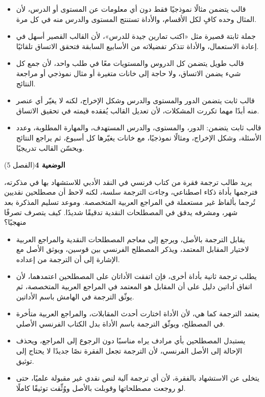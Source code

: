 \documentclass[11pt,a4paper]{article}
\begin{document}
\begin{itemize}[leftmargin=1.0cm, labelsep=6pt, itemsep=3pt, topsep=4pt, parsep=0pt]
  \item[\textbf{أ)}] قالب يتضمن مثالًا نموذجيًا فقط دون أي معلومات عن المستوى أو الدرس، لأن المثال وحده كافٍ لكل الأقسام، والأداة تستنتج المستوى والدرس منه في كل مرة.
  \item[\textbf{ب)}] جملة ثابتة قصيرة مثل «اكتب تمارين جيدة للدرس»، لأن القالب القصير أسهل في إعادة الاستعمال، والأداة تتذكر تفضيلاته من الأسابيع السابقة فتحقق الاتساق تلقائيًا.
  \item[\textbf{ج)}] قالب طويل يتضمن كل الدروس والمستويات معًا في طلب واحد، لأن جمع كل شيء يضمن الاتساق، ولا حاجة إلى خانات متغيرة أو مثال نموذجي أو مراجعة النتائج.
  \item[\textbf{د)}] قالب ثابت يتضمن الدور والمستوى والدرس وشكل الإخراج، لكنه لا يغيّر أي عنصر منه أبدًا مهما تكررت المشكلات، لأن تعديل القالب يُفقده قيمته في تحقيق الاتساق.
  \item[\textbf{هـ)}] قالب ثابت يتضمن: الدور، والمستوى، والدرس المستهدف، والمهارة المطلوبة، وعدد الأسئلة، وشكل الإخراج، ومثالًا نموذجيًا، مع خانات يغيّرها كل أسبوع، ثم يراجع النتائج ويحسّن القالب تدريجيًا.
\end{itemize}
\par\vspace{6pt}
\noindent
{\large\khatt\textbf{الوضعية 4}}\hfill{\small(الفصل 5)}\par\nopagebreak\vspace{3pt}
\setlength{\fboxsep}{7pt}\colorbox{gray!10}{\parbox{\dimexpr\linewidth-14pt}{يريد طالب ترجمة فقرة من كتاب فرنسي في النقد الأدبي للاستشهاد بها في مذكرته، فترجمها بأداة ذكاء اصطناعي، وجاءت الترجمة سلسة، لكنه لاحظ أن مصطلحين نقديين تُرجما بألفاظ غير مستعملة في المراجع العربية المتخصصة. وموعد تسليم المذكرة بعد شهر، ومشرفه يدقق في المصطلحات النقدية تدقيقًا شديدًا. كيف يتصرف تصرفًا منهجيًا؟}}\par\nopagebreak
\begin{itemize}[leftmargin=1.0cm, labelsep=6pt, itemsep=3pt, topsep=4pt, parsep=0pt]
  \item[\textbf{أ)}] يقابل الترجمة بالأصل، ويرجع إلى معاجم المصطلحات النقدية والمراجع العربية لاختيار المقابل المعتمد، ويذكر المصطلح الفرنسي بين قوسين، ويوثق الأصل مع الإشارة إلى أن الترجمة من إعداده.
  \item[\textbf{ب)}] يطلب ترجمة ثانية بأداة أخرى، فإن اتفقت الأداتان على المصطلحين اعتمدهما، لأن اتفاق أداتين دليل على أن المقابل هو المعتمد في المراجع العربية المتخصصة، ثم يوثّق الترجمة في الهامش باسم الأداتين.
  \item[\textbf{ج)}] يعتمد الترجمة كما هي، لأن الأداة اختارت أحدث المقابلات، والمراجع العربية متأخرة في المصطلح، ويوثّق الترجمة باسم الأداة بدل الكتاب الفرنسي الأصلي.
  \item[\textbf{د)}] يستبدل المصطلحين بأي مرادف يراه مناسبًا دون الرجوع إلى المراجع، ويحذف الإحالة إلى الأصل الفرنسي، لأن الترجمة تجعل الفقرة نصًا جديدًا لا يحتاج إلى توثيق.
  \item[\textbf{هـ)}] يتخلى عن الاستشهاد بالفقرة، لأن أي ترجمة آلية لنص نقدي غير مقبولة علميًا، حتى لو روجعت مصطلحاتها وقوبلت بالأصل ووُثِّقت توثيقًا كاملًا.
\end{itemize}
\end{document}
